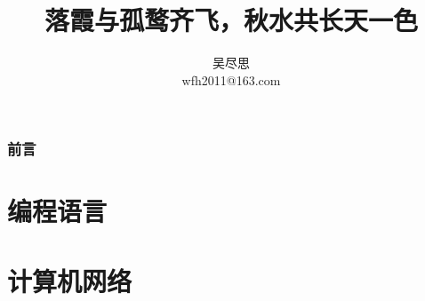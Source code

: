 \documentclass[
  paper = a4paper,
  UTF8,
  oneside,
  zihao=-4,
  linespread = 1.5,
  heading = true,
]{ctexbook}
\title{落霞与孤鹜齐飞，秋水共长天一色}
\author{
  吴尽思 \\ wfh2011@163.com
}
\date{\zhtoday}
\begin{document}
\maketitle

\frontmatter
{}
\section*{前言}\label{sec:preface}


\tableofcontents
\listoffigures
\lstlistoflistings

\mainmatter
{}

\part{编程语言}



\part{计算机网络}
 \label{tcp-ip:ch12}


\printbibliography[title={参考文献}]
\end{document}
